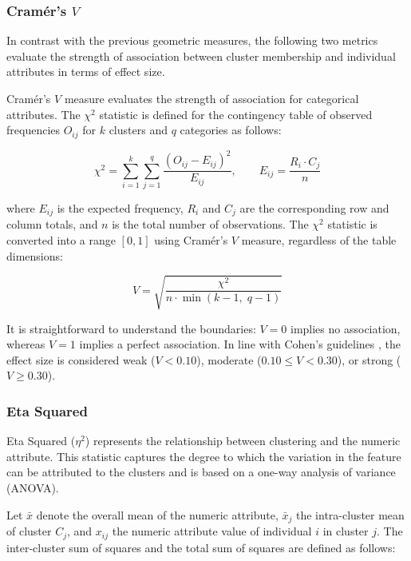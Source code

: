 \subsubsection*{Cramér's $V$}

In contrast with the previous geometric measures, the following two metrics evaluate the strength of association between cluster membership and individual attributes in terms of effect size.

Cramér’s $V$ measure \cite{cramer1946} evaluates the strength of association for categorical attributes. The $\chi^2$ statistic is defined for the contingency table of observed frequencies $O_{ij}$ for $k$ clusters and $q$ categories as follows:

\begin{equation}
    \chi^2 = \sum_{i=1}^{k} \sum_{j=1}^{q} \frac{(O_{ij} - E_{ij})^2}{E_{ij}}, \qquad E_{ij} = \frac{R_i \cdot C_j}{n}
    \label{eq:chisq}
\end{equation}

where $E_{ij}$ is the expected frequency, $R_i$ and $C_j$ are the corresponding row and column totals, and $n$ is the total number of observations. The $\chi^2$ statistic is converted into a range $[0, 1]$ using Cramér’s $V$ measure, regardless of the table dimensions:

\begin{equation}
    V = \sqrt{\frac{\chi^2}{n \cdot \min(k-1,\; q-1)}}
    \label{eq:cramer_v}
\end{equation}

It is straightforward to understand the boundaries: $V=0$ implies no association, whereas $V=1$ implies a perfect association. In line with Cohen's guidelines \cite{cohen1988}, the effect size is considered weak ($V<0.10$), moderate ($0.10 \leq V<0.30$), or strong ($V \geq 0.30$).

\subsubsection*{Eta Squared}

Eta Squared ($\eta^2$) represents the relationship between clustering and the numeric attribute. This statistic captures the degree to which the variation in the feature can be attributed to the clusters and is based on a one-way analysis of variance (ANOVA).

Let $\bar{x}$ denote the overall mean of the numeric attribute, $\bar{x}_j$ the intra-cluster mean of cluster $C_j$, and $x_{ij}$ the numeric attribute value of individual $i$ in cluster $j$. The inter-cluster sum of squares and the total sum of squares are defined as follows:

